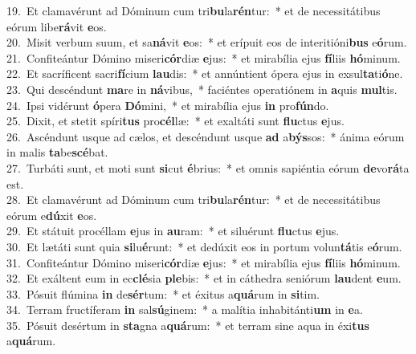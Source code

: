{19.~}Et clamavérunt ad Dóminum cum tri\textbf{bu}la\textbf{rén}tur:~* et de necessitátibus eórum libe\textbf{rá}vit \textbf{e}os.\\
{20.~}Misit verbum suum, et sa\textbf{ná}vit \textbf{e}os:~* et erípuit eos de interitióni\textbf{bus} e\textbf{ó}rum.\\
{21.~}Confiteántur Dómino miseri\textbf{cór}diæ \textbf{e}jus:~* et mirabília ejus \textbf{fí}liis \textbf{hó}minum.\\
{22.~}Et sacríficent sacri\textbf{fí}cium \textbf{lau}dis:~* et annúntient ópera ejus in exsul\textbf{ta}ti\textbf{ó}ne.\\
{23.~}Qui descéndunt \textbf{ma}re in \textbf{ná}vibus,~* faciéntes operatiónem in \textbf{a}quis \textbf{mul}tis.\\
{24.~}Ipsi vidérunt \textbf{ó}pera \textbf{Dó}mini,~* et mirabília ejus \textbf{in} pro\textbf{fún}do.\\
{25.~}Dixit, et stetit spíri\textbf{tus} pro\textbf{cél}læ:~* et exaltáti sunt \textbf{flu}ctus \textbf{e}jus.\\
{26.~}Ascéndunt usque ad cælos, et descéndunt usque \textbf{ad} a\textbf{býs}sos:~* ánima eórum in malis \textbf{ta}be\textbf{scé}bat.\\
{27.~}Turbáti sunt, et moti sunt \textbf{si}cut \textbf{é}brius:~* et omnis sapiéntia eórum \textbf{de}vo\textbf{rá}ta est.\\
{28.~}Et clamavérunt ad Dóminum cum tri\textbf{bu}la\textbf{rén}tur:~* et de necessitátibus eórum e\textbf{dú}xit \textbf{e}os.\\
{29.~}Et státuit procéllam \textbf{e}jus in \textbf{au}ram:~* et siluérunt \textbf{flu}ctus \textbf{e}jus.\\
{30.~}Et lætáti sunt quia \textbf{si}lu\textbf{é}runt:~* et dedúxit eos in portum volun\textbf{tá}tis e\textbf{ó}rum.\\
{31.~}Confiteántur Dómino miseri\textbf{cór}diæ \textbf{e}jus:~* et mirabília ejus \textbf{fí}liis \textbf{hó}minum.\\
{32.~}Et exáltent eum in ec\textbf{clé}sia \textbf{ple}bis:~* et in cáthedra seniórum \textbf{lau}dent \textbf{e}um.\\
{33.~}Pósuit flúmina \textbf{in} de\textbf{sér}tum:~* et éxitus a\textbf{quá}rum in \textbf{si}tim.\\
{34.~}Terram fructíferam \textbf{in} sal\textbf{sú}ginem:~* a malítia inhabitánti\textbf{um} in \textbf{e}a.\\
{35.~}Pósuit desértum in \textbf{sta}gna a\textbf{quá}rum:~* et terram sine aqua in éxi\textbf{tus} a\textbf{quá}rum.\\
